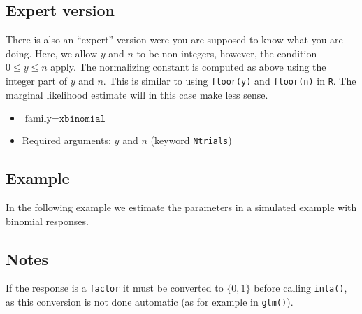 \documentclass[a4paper,11pt]{article}
\begin{document}
\subsection*{Expert version}
There is also an ``expert'' version were you are supposed to know what
you are doing. Here, we allow $y$ and $n$ to be non-integers, however,
the condition $0\le y \le n$ apply. The normalizing constant is
computed as above using the integer part of $y$ and $n$. This is
similar to using \verb|floor(y)| and \verb|floor(n)| in \verb|R|. The
marginal likelihood estimate will in this case make less sense.
\begin{itemize}
\item $\text{family}=\texttt{xbinomial}$
\item Required arguments: $y$ and $n$ (keyword \texttt{Ntrials})
\end{itemize}


\subsection*{Example}

In the following example we estimate the parameters in a simulated
example with binomial responses.


\subsection*{Notes}

If the response is a \verb|factor| it must be converted to $\{0,1\}$
before calling \verb|inla()|, as this conversion is not done automatic
(as for example in \verb|glm()|).
\end{document}
